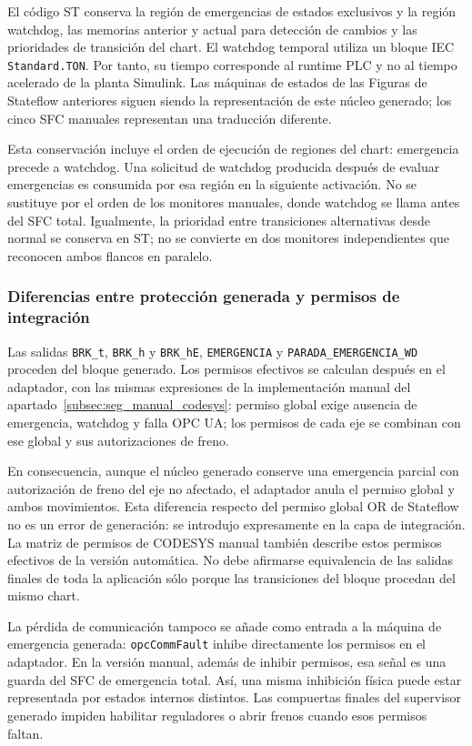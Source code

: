 \documentclass[a4paper,10pt,onecolumn,journal]{ieeeconf}
\numberwithin{equation}{section}
\begin{document}
El código ST conserva la región de emergencias de estados exclusivos y la región watchdog, las memorias anterior y actual para detección de cambios y las prioridades de transición del chart. El watchdog temporal utiliza un bloque IEC \texttt{Standard.TON}. Por tanto, su tiempo corresponde al runtime PLC y no al tiempo acelerado de la planta Simulink. Las máquinas de estados de las Figuras de Stateflow anteriores siguen siendo la representación de este núcleo generado; los cinco SFC manuales representan una traducción diferente.

Esta conservación incluye el orden de ejecución de regiones del chart: emergencia precede a watchdog. Una solicitud de watchdog producida después de evaluar emergencias es consumida por esa región en la siguiente activación. No se sustituye por el orden de los monitores manuales, donde watchdog se llama antes del SFC total. Igualmente, la prioridad entre transiciones alternativas desde normal se conserva en ST; no se convierte en dos monitores independientes que reconocen ambos flancos en paralelo.


\subsubsection{Diferencias entre protección generada y permisos de integración}
Las salidas \texttt{BRK\_t}, \texttt{BRK\_h} y \texttt{BRK\_hE}, \texttt{EMERGENCIA} y \texttt{PARADA\_EMERGENCIA\_WD} proceden del bloque generado. Los permisos efectivos se calculan después en el adaptador, con las mismas expresiones de la implementación manual del apartado~\ref{subsec:seg_manual_codesys}: permiso global exige ausencia de emergencia, watchdog y falla OPC UA; los permisos de cada eje se combinan con ese global y sus autorizaciones de freno.

En consecuencia, aunque el núcleo generado conserve una emergencia parcial con autorización de freno del eje no afectado, el adaptador anula el permiso global y ambos movimientos. Esta diferencia respecto del permiso global OR de Stateflow no es un error de generación: se introdujo expresamente en la capa de integración. La matriz de permisos de CODESYS manual también describe estos permisos efectivos de la versión automática. No debe afirmarse equivalencia de las salidas finales de toda la aplicación sólo porque las transiciones del bloque procedan del mismo chart.

La pérdida de comunicación tampoco se añade como entrada a la máquina de emergencia generada: \texttt{opcCommFault} inhibe directamente los permisos en el adaptador. En la versión manual, además de inhibir permisos, esa señal es una guarda del SFC de emergencia total. Así, una misma inhibición física puede estar representada por estados internos distintos. Las compuertas finales del supervisor generado impiden habilitar reguladores o abrir frenos cuando esos permisos faltan.
\end{document}
